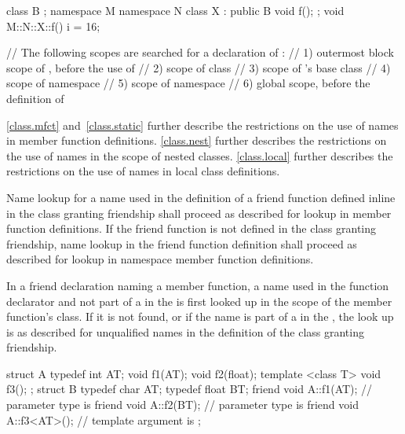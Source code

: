 \begin{example}
\begin{codeblock}
class B { };
namespace M {
  namespace N {
    class X : public B {
      void f();
    };
  }
}
void M::N::X::f() {
  i = 16;
}

// The following scopes are searched for a declaration of :
// 1) outermost block scope of , before the use of 
// 2) scope of class 
// 3) scope of 's base class 
// 4) scope of namespace 
// 5) scope of namespace 
// 6) global scope, before the definition of 
\end{codeblock}
\end{example} \begin{note} \ref{class.mfct} and~\ref{class.static} further
describe the restrictions on the use of names in member function
definitions. \ref{class.nest} further describes the restrictions on the
use of names in the scope of nested classes. \ref{class.local} further
describes the restrictions on the use of names in local class
definitions. \end{note}

\pnum
Name lookup for a name used in the definition of a friend
function defined inline in the class granting
friendship shall proceed as described for lookup in member function
definitions. If the friend function is not defined in the class
granting friendship, name lookup in the friend function
definition shall proceed as described for lookup in namespace member
function definitions.

\pnum
In a friend declaration naming a member function, a name used in
the function declarator and not part of a 
in the  is first looked up in the scope of the
member function's class. If it is not found,
or if the name is part of a
 in
the , the look up is
as described for unqualified names in the definition of the class
granting friendship. \begin{example}

\begin{codeblock}
struct A {
  typedef int AT;
  void f1(AT);
  void f2(float);
  template <class T> void f3();
};
struct B {
  typedef char AT;
  typedef float BT;
  friend void A::f1(AT);      // parameter type is 
  friend void A::f2(BT);      // parameter type is 
  friend void A::f3<AT>();    // template argument is 
};
\end{codeblock}
\end{example}

